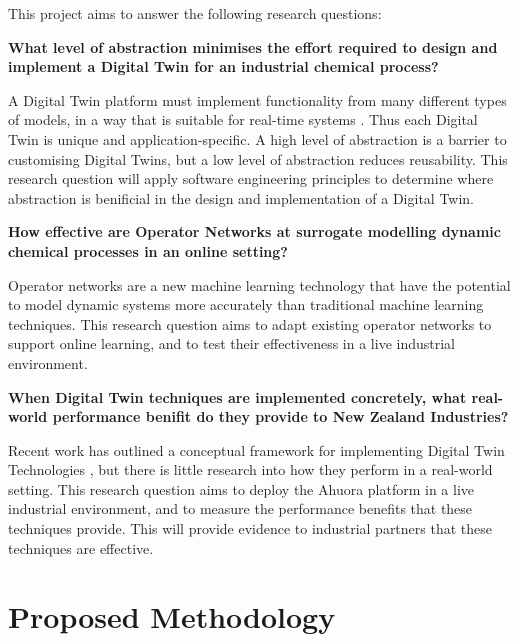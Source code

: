 \documentclass[12pt]{article}
\begin{document}
This project aims to answer the following research questions:

\textbf{What level of abstraction minimises the effort required to design and implement a Digital Twin for an industrial chemical process?}

 A Digital Twin platform must implement functionality from many different types of models, in a way that is suitable for real-time systems \cite{cao2021simulation}. Thus each Digital Twin is unique and application-specific. A high level of abstraction is a barrier to customising Digital Twins, but a low level of abstraction reduces reusability. This research question will apply software engineering principles to determine where abstraction is benificial in the design and implementation of a Digital Twin.


\textbf{How effective are Operator Networks at surrogate modelling dynamic chemical processes in an online setting?} %

Operator networks are a new machine learning technology that have the potential to model dynamic systems more accurately than traditional machine learning techniques. This research question aims to adapt existing operator networks to support online learning, and to test their effectiveness in a live industrial environment. 

\textbf{When Digital Twin techniques are implemented concretely, what real-world performance benifit do they provide to New Zealand Industries?}

Recent work has outlined a conceptual framework for implementing Digital Twin Technologies \cite{ors2020conceptual}, but there is little research into how they perform in a real-world setting. This research question aims to deploy the Ahuora platform in a live industrial environment, and to measure the performance benefits that these techniques provide. This will provide evidence to industrial partners that these techniques are effective. 


\section*{Proposed Methodology}
\end{document}
